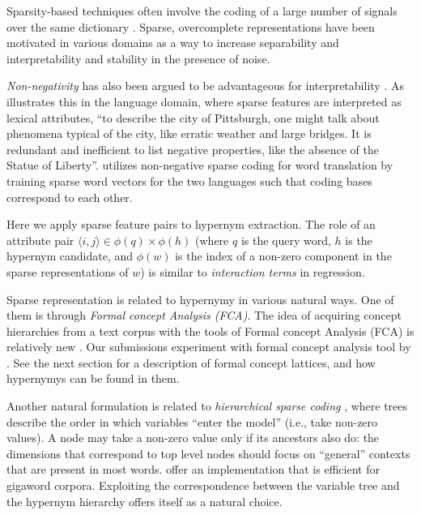 \documentclass[11pt,a4paper]{article}
\begin{document}
Sparsity-based techniques often involve the coding of a large number of signals
over the same dictionary \citep{Rubinstein:2008}. Sparse, overcomplete
representations have been motivated in various domains as a way to increase
separability and interpretability \citep{Olshausen:1997} and
stability in the presence of noise.

\emph{Non-negativity} has also been argued to be advantageous for 
interpretability
\citep{Faruqui:2015,Fyshe:2015,Arora:2016}. As \citet{Subramanian:2018}
illustrates this in the language domain, where sparse features are interpreted
as lexical attributes, ``to describe the city of Pittsburgh, one might talk
about phenomena typical of the city, like erratic weather and large bridges. It
is redundant and inefficient to list negative properties, like the absence of
the Statue of Liberty''.
\citet{Berend:2018} utilizes non-negative sparse coding for word translation by
training sparse word vectors for the two languages such that coding bases
correspond to each other.

Here we apply sparse feature pairs to hypernym extraction. The role of an
attribute pair $\langle i,j\rangle\in\phi(q)\times\phi(h)$ (where $q$ is the query word,
$h$ is the hypernym candidate, and $\phi(w)$ is the index of a non-zero
component in the sparse representations of $w$) is similar to \emph{interaction
terms} in regression.

Sparse representation is related to hypernymy in various natural ways.  One of
them is through \emph{Formal concept Analysis (FCA)}.  The idea of acquiring concept
hierarchies from a text corpus with the tools of Formal concept Analysis (FCA)
is relatively new \citep{Cimiano:2005}.
Our submissions experiment with formal concept analysis tool by
\citet{Endres:2010}. See the next section for a description of formal concept
lattices, and how hypernymys can be found in them.

Another natural formulation is related to \emph{hierarchical sparse coding}
\citep{Zhao:2009}, where trees describe the order in which variables “enter the
model” (i.e., take non-zero values). A node may take a non-zero value only if its
ancestors also do: the dimensions that correspond to top level nodes should
focus on “general” contexts that are present in most words.
\citet{Yogatama:2015} offer an implementation that is efficient for gigaword
corpora. Exploiting the correspondence between the variable tree and the
hypernym hierarchy offers itself as a natural choice.
\end{document}
